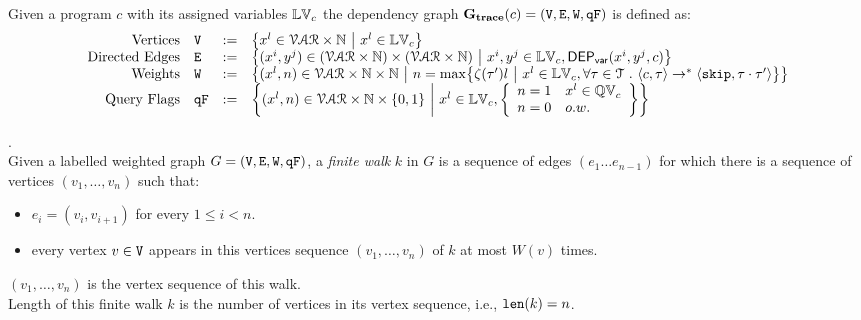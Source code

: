 \begin{defn}
\label{def:trace_graph}
Given a program ${c}$ with its assigned variables $\mathbb{LV}_c$ 
the dependency graph $\mathtt{\bf{G_{trace}}}({c}) = (\mathtt{V}, \mathtt{E}, \mathtt{W}, \mathtt{qF})$ is defined as:
%
\[
\begin{array}{rlcl}
  \text{Vertices} &
  \vertxs & := & \left\{ 
  x^l \in \mathcal{VAR} \times \mathbb{N} 
  ~ \middle\vert ~ x^l \in \lvar_{c}
  \right\}
  \\
  \text{Directed Edges} &
  \edges & := & 
  \left\{ 
  (x^i, y^j) \in (\mathcal{VAR} \times \mathbb{N}) \times (\mathcal{VAR} \times \mathbb{N})
  ~ \middle\vert ~
  x^i, y^j \in \lvar_{{c}}, \vardep(x^i, y^j, c)
  
  \right\}
  \\
  \text{Weights} &
  \weights & := & 
  \left\{ 
  (x^l, n) \in \mathcal{VAR} \times \mathbb{N} \times \mathbb{N}
  ~ \middle\vert ~ 
  n = \max \left\{ \vcounter(\vtrace') l ~ \middle\vert ~ x^l \in \lvar_{c},
  \forall \vtrace \in \mathcal{T} \st \config{{c}, \trace} \to^{*} \config{\eskip, \trace\cdot\vtrace'} 
   \right\}
  \right\}
  \\
  \text{Query Flags} &
  \qflag & := & 
  \left\{(x^l, n)  \in \mathcal{VAR} \times \mathbb{N}  \times \{0, 1\} 
  ~ \middle\vert ~
   x^l \in \lvar_{c},
   \left\{
  \begin{array}{ll}
  n = 1 & x^l \in \qvar_{c} \\ 
  n = 0 & o.w.
  \end{array}
  \right\}
  \right\}
\end{array}
\]
\end{defn}
%
%
\begin{defn}.
\label{def:finitewalk}
\\
Given a labelled weighted graph $G = (\mathtt{V}, \mathtt{E}, \mathtt{W}, \mathtt{qF})$, a \emph{finite walk} $k$ in $G$ is a sequence of edges $(e_1 \ldots e_{n - 1})$ 
for which there is a sequence of vertices $(v_1, \ldots, v_{n})$ such that:
\begin{itemize}
    \item $e_i = (v_{i},v_{i + 1})$ for every $1 \leq i < n$.
    \item every vertex $v \in \mathtt{V}$ appears in this vertices sequence $(v_1, \ldots, v_{n})$ of $k$ at most $W(v)$ times.  
\end{itemize}
$(v_1, \ldots, v_{n})$ is the vertex sequence of this walk.
\\
%
Length of this finite walk $k$ is the number of vertices in its vertex sequence, i.e., $\mathtt{len}(k) = n$.
\end{defn}
